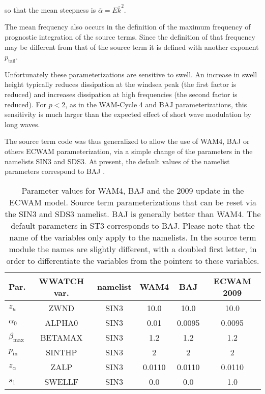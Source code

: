 \noindent
so that the mean steepness is $\overline{\alpha}=E \overline{k}^2$.

The mean frequency also occurs in the definition of the maximum frequency of
prognostic integration of the source terms. Since the definition of that
frequency may be different from that of the source term it is defined with
another exponent $p_{\mathrm{tail}}$.

Unfortunately these parameterizations are sensitive to swell. An increase in
swell height typically reduces dissipation at the windsea peak (the first
factor is reduced) and increases dissipation at high frequencies (the second
factor is reduced). For $p< 2$, as in the WAM-Cycle 4 and BAJ
parameterizations, this sensitivity is much larger than the expected effect of
short wave modulation by long waves.

The source term code was thus generalized to
allow the use of WAM4, BAJ or others ECWAM parameterization, via a simple change of
the parameters in the namelists SIN3 and SDS3. At present, the default values of the namelist
parameters correspond to BAJ \citep{rep:Bea05}.

\begin{table} \begin{center}
\begin{tabular}{|l|c|c|c|c|c|} \hline \hline
Par.         &  WWATCH var.           & namelist & WAM4 & BAJ   & ECWAM 2009 \\
\hline
  $z_u$ &  ZWND                       & SIN3 & 10.0    & 10.0   & 10.0   \\
  $\alpha_0$ &  ALPHA0                & SIN3 & 0.01    & 0.0095 &  0.0095 \\
  $\beta_{\mathrm{max}}$ & BETAMAX    & SIN3 & 1.2     & 1.2    & 1.2  \\
  $p_{\mathrm{in}}$ &  SINTHP         & SIN3 & 2       & 2      & 2  \\
  $z_\alpha$ &  ZALP                  & SIN3 & 0.0110  & 0.0110 &  0.0110 \\
  $s_1$ &  SWELLF                     & SIN3 & 0.0     & 0.0    & 1.0   \\
\hline
\end{tabular} \end{center}
\caption{Parameter values for WAM4, BAJ and the 2009 update in the ECWAM model. Source term
parameterizations that can be reset via the SIN3 and SDS3 namelist. BAJ is
generally better than WAM4. The default parameters in ST3 corresponds to BAJ. Please
note that the name of the variables only apply to the namelists. In the source
term module the names are slightly different, with a doubled first letter, in
order to differentiate the variables from the pointers to these variables.} \label{tab:WAM4_parSIN}
\end{table}

